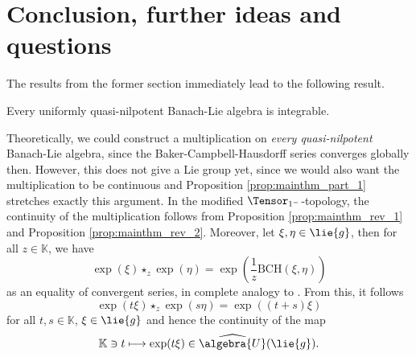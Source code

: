 \documentclass[
11pt,                          %
english                        %
]{article}
\newcommand{\bch}[2]{\mathrm{BCH}\left(#1, #2\right)}
\begin{document}
\section{Conclusion, further ideas and questions}
The results from the former section immediately lead to the following result.
\begin{corollary}
	Every uniformly quasi-nilpotent Banach-Lie algebra is integrable.
\end{corollary}
Theoretically, we could construct a multiplication on \emph{every quasi-nilpotent}
Banach-Lie algebra, since the Baker-Campbell-Hausdorff series converges globally 
then. However, this does not give a Lie group yet, since we would also want the 
multiplication to be continuous and Proposition \ref{prop:mainthm_part_1} stretches 
exactly this argument. In the modified $\Tensor_{1^-}$-topology, the continuity of 
the multiplication follows from Proposition \ref{prop:mainthm_rev_1} and Proposition 
\ref{prop:mainthm_rev_2}. Moreover, let $\xi, \eta \in \lie{g}$, then for all 
$z \in \mathbb{K}$, we have
\begin{equation}
	\exp(\xi) \star_z \exp(\eta)
	=
	\exp\left(
		\frac{1}{z}
		\bch{\xi}{\eta}
	\right)
\end{equation}
as an equality of convergent series, in complete analogy to 
\cite[Corollary 4.3]{esposito.stapor.waldmann:2015a:pre}. From this, it follows
\begin{equation}
	\exp(t \xi) \star_z \exp(s \eta)
	=
	\exp((t + s) \xi)
\end{equation}
for all $t,s \in \mathbb{K}$, $\xi \in \lie{g}$ and hence the continuity of the map
\begin{equation}
	\mathbb{K}
	\ni
	t
	\longmapsto
	\exp(t \xi)
	\in
	\widehat{\algebra{U}}(\lie{g}).
\end{equation}
\end{document}
